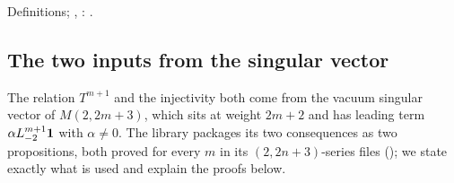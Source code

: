 \begin{status}
Definitions; , : .
\end{status}

\subsection{The two inputs from the singular vector}

The relation $T^{m+1}$ and the injectivity both come from the vacuum singular vector of $M(2,2m+3)$, which sits at weight
$2m+2$ and has leading term $\alpha L_{-2}^{m+1}\mathbf{1}$ with $\alpha\ne0$. The library packages its two consequences as
two propositions, both proved for every $m$ in its $(2,2n+3)$-series files ();
we state exactly what is used and explain the proofs below.

